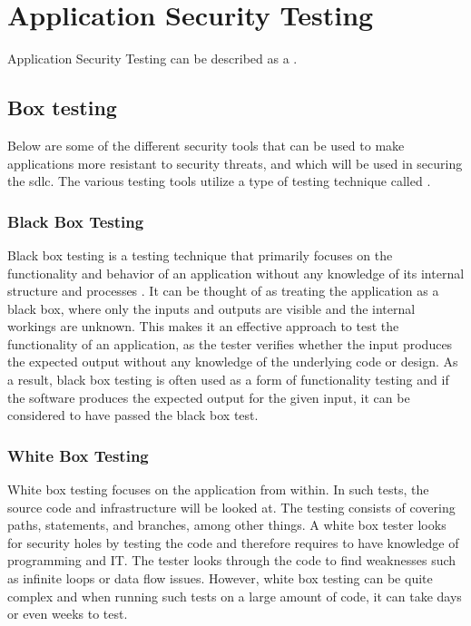 \section{Application Security Testing}
Application Security Testing can be described as a \textit{} \cite{AST}.

\subsection{Box testing}
\label{boxtesting}
Below are some of the different security tools that can be used to make applications more resistant to security threats, and which will be used in securing the \acrshort{sdlc}. 
The various testing tools utilize a type of testing technique called .

\subsubsection{Black Box Testing}
\label{BlackBoxTesting}
Black box testing is a testing technique that primarily focuses on the functionality and behavior of an application without any knowledge of its internal structure and processes  \cite{blackbox}. It can be thought of as treating the application as a black box, where only the inputs and outputs are visible and the internal workings are unknown. This makes it an effective approach to test the functionality of an application, as the tester verifies whether the input produces the expected output without any knowledge of the underlying code or design. As a result, black box testing is often used as a form of functionality testing \cite{BlackBoxTestingFunctional} and if the software produces the expected output for the given input, it can be considered to have passed the black box test. 

\subsubsection{White Box Testing}
White box testing focuses on the application from within. In such tests, the source code and infrastructure will be looked at. The testing consists of covering paths, statements, and branches, among other things. A white box tester looks for security holes by testing the code and therefore requires to have knowledge of programming and IT. The tester looks through the code to find weaknesses such as infinite loops or data flow issues. However, white box testing can be quite complex and when running such tests on a large amount of code, it can take days or even weeks to test. \cite{whitebox}

